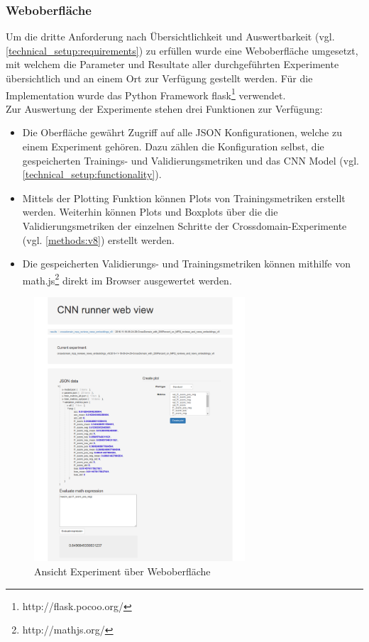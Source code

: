 \subsubsection{Weboberfläche}
Um die dritte Anforderung nach Übersichtlichkeit und Auswertbarkeit (vgl. \ref{technical_setup:requirements}) zu erfüllen wurde eine Weboberfläche umgesetzt, mit welchem die Parameter und Resultate aller durchgeführten Experimente übersichtlich und an einem Ort zur Verfügung gestellt werden. Für die Implementation wurde das Python Framework flask\footnote{http://flask.pocoo.org/} verwendet.\\
Zur Auswertung der Experimente stehen drei Funktionen zur Verfügung:
\begin{itemize}
	\item Die Oberfläche gewährt Zugriff auf alle JSON Konfigurationen, welche zu einem Experiment gehören. Dazu zählen die Konfiguration selbst, die gespeicherten Trainings- und Validierungsmetriken und das CNN Model (vgl. \ref{technical_setup:functionality}).
	\item Mittels der Plotting Funktion können Plots von Trainingsmetriken erstellt werden. Weiterhin können Plots und Boxplots über die die Validierungsmetriken der einzelnen Schritte der Crossdomain-Experimente (vgl. \ref{methods:v8}) erstellt werden.
	\item Die gespeicherten Validierungs- und Trainingsmetriken können mithilfe von math.js\footnote{http://mathjs.org/} direkt im Browser ausgewertet werden.
\end{itemize}
\begin{figure}[htbp]
	\centering
	\includegraphics[width=0.7\textwidth]{img/web_gui}
	\caption{Ansicht Experiment über Weboberfläche}
	\label{fig:web_gui}
\end{figure}
